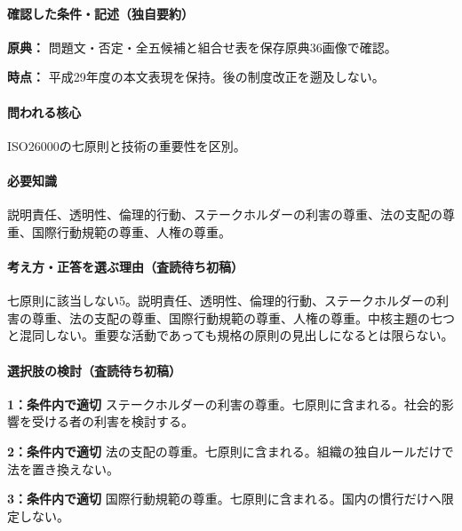\paragraph{確認した条件・記述（独自要約）}\mbox{}\par

\noindent\textbf{原典：} 問題文・否定・全五候補と組合せ表を保存原典36画像で確認。\par

\noindent\textbf{時点：} 平成29年度の本文表現を保持。後の制度改正を遡及しない。\par

\paragraph{問われる核心} ISO26000の七原則と技術の重要性を区別。

\paragraph{必要知識} 説明責任、透明性、倫理的行動、ステークホルダーの利害の尊重、法の支配の尊重、国際行動規範の尊重、人権の尊重。

\paragraph{考え方・正答を選ぶ理由（査読待ち初稿）} 七原則に該当しない5。説明責任、透明性、倫理的行動、ステークホルダーの利害の尊重、法の支配の尊重、国際行動規範の尊重、人権の尊重。中核主題の七つと混同しない。重要な活動であっても規格の原則の見出しになるとは限らない。

\paragraph{選択肢の検討（査読待ち初稿）}\mbox{}\par

\noindent\textbf{1：条件内で適切} ステークホルダーの利害の尊重。七原則に含まれる。社会的影響を受ける者の利害を検討する。\par

\noindent\textbf{2：条件内で適切} 法の支配の尊重。七原則に含まれる。組織の独自ルールだけで法を置き換えない。\par

\noindent\textbf{3：条件内で適切} 国際行動規範の尊重。七原則に含まれる。国内の慣行だけへ限定しない。\par

